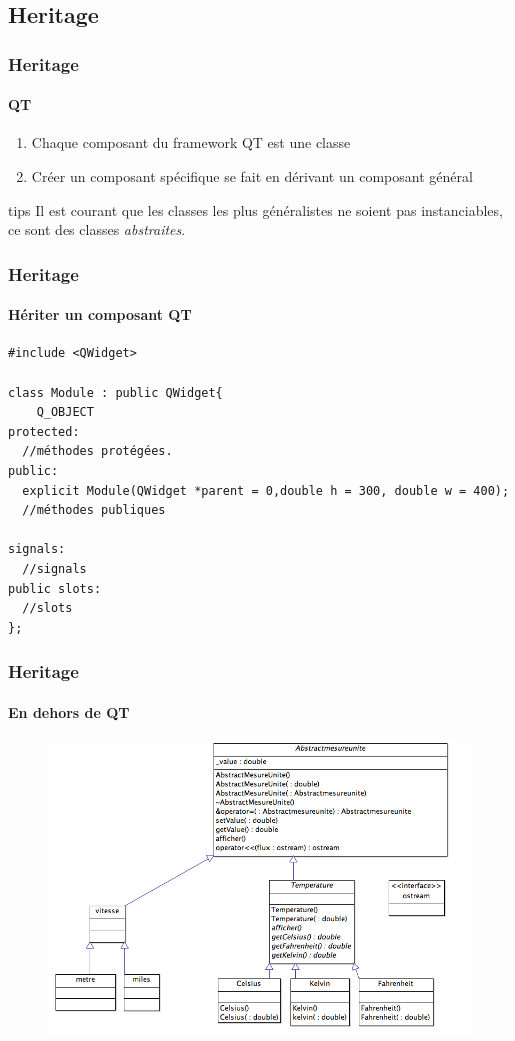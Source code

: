\documentclass[10pt]{beamer}
\begin{document}
  \subsection{Heritage}
\begin{frame}
  \frametitle{Heritage}
  \framesubtitle{QT}

  \begin{enumerate}
    \item Chaque composant du framework QT est une classe
    \item Créer un composant spécifique se fait en dérivant un composant général
  \end{enumerate}
  \begin{block}{tips}
    Il est courant que les classes les plus généralistes ne soient pas instanciables, ce sont des classes \emph{abstraites}.
  \end{block}
\end{frame}

\begin{frame}[fragile]
  \frametitle{Heritage}
  \framesubtitle{Hériter un composant QT}

  \begin{verbatim}
#include <QWidget>

class Module : public QWidget{
    Q_OBJECT
protected:
  //méthodes protégées.
public:
  explicit Module(QWidget *parent = 0,double h = 300, double w = 400);
  //méthodes publiques

signals:
  //signals
public slots:
  //slots
};
  \end{verbatim}
\end{frame}

\begin{frame}[fragile]
  \frametitle{Heritage}
  \framesubtitle{En dehors de QT}
  \begin{center}
    \begin{figure}
      \includegraphics[scale=0.4]{img/Diagrammedeclasses.png}
    \end{figure}
  \end{center}
\end{frame}
\end{document}
